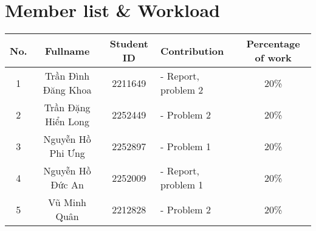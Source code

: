 \newpage

\section{Member list \& Workload}

\begin{center}
\begin{tabular}{|c|c|c|l|c|}
\hline
\textbf{No.} & \textbf{Fullname} & \textbf{Student ID} & \textbf{Contribution} & \textbf{Percentage of work}\\
\hline 
\multirow{1}{*}{1} & \multirow{1}{*}{Trần Đình Đăng Khoa} & \multirow{1}{*}{2211649} & - Report, problem 2& \multirow{1}{*}{20\%}\\
\hline 
\multirow{1}{*}{2} & \multirow{1}{*}{Trần Đặng Hiển Long} & \multirow{1}{*}{2252449} & - Problem 2& \multirow{1}{*}{20\%}\\
\hline
\multirow{1}{*}{3} & \multirow{1}{*}{Nguyễn Hồ Phi Ưng} & \multirow{1}{*}{2252897} & - Problem 1& \multirow{1}{*}{20\%}\\
\hline
\multirow{1}{*}{4} & \multirow{1}{*}{Nguyễn Hồ Đức An} & \multirow{1}{*}{2252009} & - Report, problem 1& \multirow{1}{*}{20\%}\\
\hline
\multirow{1}{*}{5} & \multirow{1}{*}{Vũ Minh Quân} & \multirow{1}{*}{2212828} & - Problem 2 & \multirow{1}{*}{20\%}\\
\hline
\end{tabular}
\end{center}